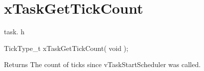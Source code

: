 \hypertarget{group__xTaskGetTickCount}{}\section{x\+Task\+Get\+Tick\+Count}
\label{group__xTaskGetTickCount}
task. h 
\begin{DoxyPre}TickType\_t xTaskGetTickCount( void );\end{DoxyPre}


\begin{DoxyReturn}{Returns}
The count of ticks since v\+Task\+Start\+Scheduler was called. 
\end{DoxyReturn}

